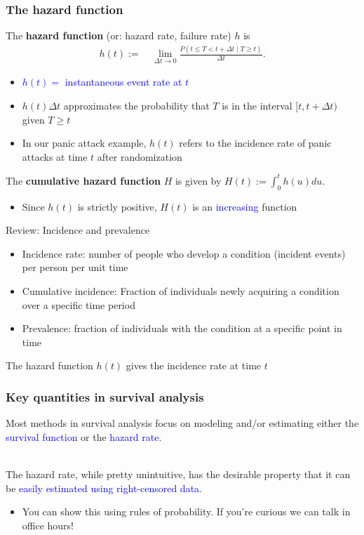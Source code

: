 \documentclass[10pt,t]{beamer}
\begin{document}
\begin{frame}
\frametitle{The hazard function}
The \textbf{hazard function} (or: hazard rate, failure rate) $h$ is
\begin{align*}
h(t) := & \ \lim_{\Delta t \to 0} \frac{P(t \leq T < t + \Delta t \mid T \geq t)}{\Delta t}.
\end{align*}\pause 
\begin{itemize}
\item \textcolor{blue}{$h(t) = $ instantaneous event rate at $t$}\pause 
\item $h(t)\Delta t$ approximates the probability that $T$ is in the interval $[t, t + \Delta t)$ given $T \geq t$\pause 
\item In our panic attack example, $h(t)$ refers to the incidence rate of panic attacks at time $t$ after randomization 
\end{itemize}
The \textbf{cumulative hazard function} $H$ is given by $H(t) := \int_0^t h(u) du$.
\begin{itemize}
	\item Since $h(t)$ is strictly positive, $H(t)$ is an \textcolor{blue}{increasing} function
\end{itemize}

\end{frame}

\begin{frame}{Review: Incidence and prevalence}
	\begin{itemize}
		\item Incidence rate: number of people who develop a condition (incident events) per person per unit time
		\item Cumulative incidence: Fraction of individuals newly acquiring a condition over a specific time period
		\item Prevalence: fraction of individuals with the condition at a specific point in time
	\end{itemize}
	The hazard function $h(t)$ gives the incidence rate at time $t$
\end{frame}


\begin{frame}
\frametitle{Key quantities in survival analysis}
Most methods in survival analysis focus on modeling and/or estimating either the \textcolor{blue}{survival function} or the \textcolor{blue}{hazard rate}.
\\ ~\ 

The hazard rate, while pretty unintuitive, has the desirable property that it can be \textcolor{blue}{easily estimated using right-censored data}.
\begin{itemize}
	\item You can show this using rules of probability. If you're curious we can talk in office hours!
\end{itemize}
\end{frame}
\end{document}
